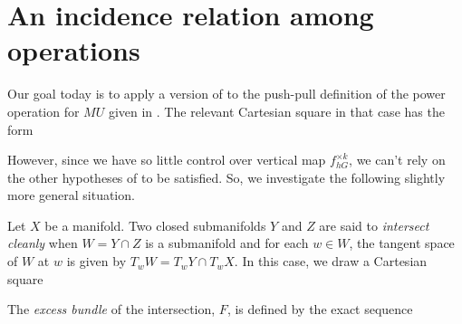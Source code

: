 







\section{An incidence relation among operations}


Our goal today is to apply a version of  to the push-pull definition of the power operation for $MU$ given in .  The relevant Cartesian square in that case has the form
\begin{center}
\end{center}
However, since we have so little control over vertical map $f^{\times k}_{hG}$, we can't rely on the other hypotheses of  to be satisfied.  So, we investigate the following slightly more general situation.

\begin{definition}
Let $X$ be a manifold.  Two closed submanifolds $Y$ and $Z$ are said to \textit{intersect cleanly} when $W = Y \cap Z$ is a submanifold and for each $w \in W$, the tangent space of $W$ at $w$ is given by $T_w W = T_w Y \cap T_w X$.  In this case, we draw a Cartesian square
\begin{center}
\end{center}
The \textit{excess bundle} of the intersection, $F$, is defined by the exact sequence
\begin{center}
\end{center}
\end{definition}

